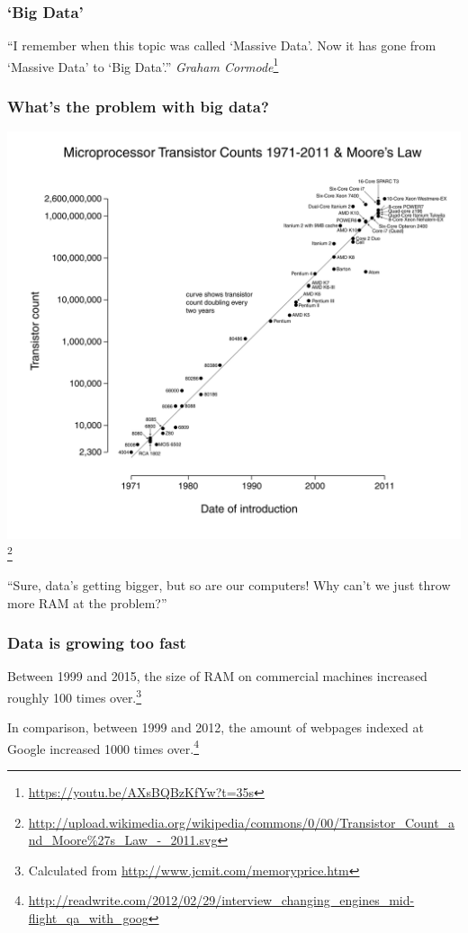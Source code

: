 \documentclass{beamer}
\begin{document}
\begin{frame}
\frametitle{`Big Data'}
``I remember when this topic was called `Massive Data'. Now it has gone from `Massive Data' to `Big Data'.''
\textit{Graham Cormode}\footnote{\url{https://youtu.be/AXsBQBzKfYw?t=35s}}
\end{frame}


\begin{frame}
\frametitle{What's the problem with big data?}
\begin{center}
\includegraphics[width=0.4\paperwidth]{moores_law}\footnote{\url{http://upload.wikimedia.org/wikipedia/commons/0/00/Transistor_Count_and_Moore\%27s_Law_-_2011.svg}}
\end{center}
``Sure, data's getting bigger, but so are our computers! Why can't we just throw more RAM at the problem?''
\end{frame}


\begin{frame}
\frametitle{Data is growing too fast}
Between 1999 and 2015, the size of RAM on commercial machines increased roughly 100 times over.\footnote{Calculated from \url{http://www.jcmit.com/memoryprice.htm}}

In comparison, between 1999 and 2012, the amount of webpages indexed at Google increased 1000 times over.\footnote{\url{http://readwrite.com/2012/02/29/interview_changing_engines_mid-flight_qa_with_goog}}
\end{frame}
\end{document}
